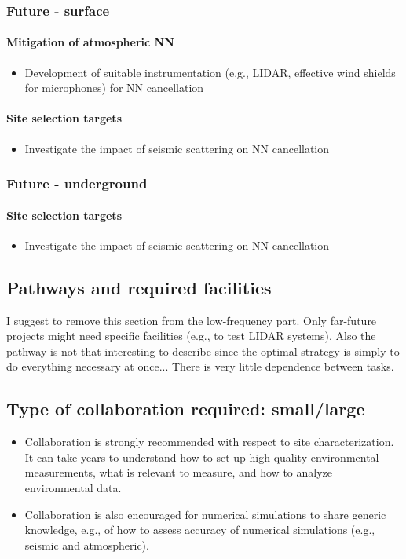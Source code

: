\subsubsection{Future - surface}
\paragraph{Mitigation of atmospheric NN}
\begin{itemize}
\item Development of suitable instrumentation (e.g., LIDAR, effective wind shields for microphones) for NN cancellation
\end{itemize}

\paragraph{Site selection targets}
\begin{itemize}
\item Investigate the impact of seismic scattering on NN cancellation
\end{itemize}

\subsubsection{Future - underground}
\paragraph{Site selection targets}
\begin{itemize}
\item Investigate the impact of seismic scattering on NN cancellation
\end{itemize}

\subsection{Pathways and required facilities}
I suggest to remove this section from the low-frequency part. Only far-future projects might need specific facilities (e.g., to test LIDAR systems). Also the pathway is not that interesting to describe since the optimal strategy is simply to do everything necessary at once... There is very little dependence between tasks.

\subsection{Type of collaboration required:  small/large}
\begin{itemize}
\item Collaboration is strongly recommended with respect to site characterization. It can take years to understand how to set up high-quality environmental measurements, what is relevant to measure, and how to analyze environmental data.
\item Collaboration is also encouraged for numerical simulations to share generic knowledge, e.g., of how to assess accuracy of numerical simulations (e.g., seismic and atmospheric). 
\end{itemize}

